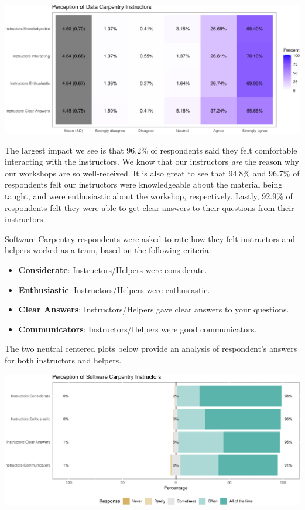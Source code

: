 \documentclass[]{article}
\makeatletter
\def\maxwidth{\ifdim\Gin@nat@width>\linewidth\linewidth\else\Gin@nat@width\fi}
\providecommand{\tightlist}{%
  \setlength{\itemsep}{0pt}\setlength{\parskip}{0pt}}
\makeatother
\begin{document}
\includegraphics[width=\maxwidth]{../figures/dc-perception-instructors-heatmap-1}

The largest impact we see is that 96.2\% of respondents said they felt
comfortable interacting with the instructors. We know that our
instructors \emph{are} the reason why our workshops are so
well-received. It is also great to see that 94.8\% and 96.7\% of
respondents felt our instructors were knowledgeable about the material
being taught, and were enthusiastic about the workshop, respectively.
Lastly, 92.9\% of respondents felt they were able to get clear answers
to their questions from their instructors.

Software Carpentry respondents were asked to rate how they felt
instructors and helpers worked as a team, based on the following
criteria:

\begin{itemize}
\tightlist
\item
  \textbf{Considerate}: Instructors/Helpers were considerate.
\item
  \textbf{Enthusiastic}: Instructors/Helpers were enthusiastic.
\item
  \textbf{Clear Answers}: Instructors/Helpers gave clear answers to your
  questions.
\item
  \textbf{Communicators}: Instructors/Helpers were good communicators.
\end{itemize}

The two neutral centered plots below provide an analysis of respondent's
answers for both instructors and helpers.

\includegraphics[width=\maxwidth]{../figures/swc-perception-instructors-1}
\end{document}
